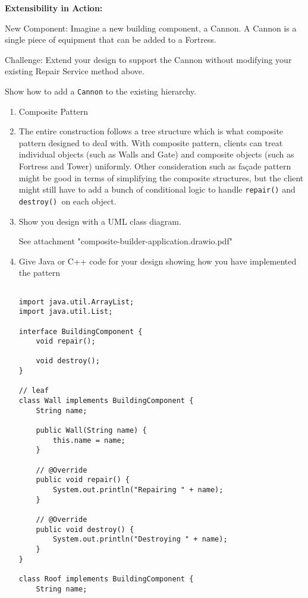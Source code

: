 {\bf Extensibility in Action:}

New Component: Imagine a new building component, a Cannon. A Cannon is a single piece of equipment that can be added to a Fortress. 

Challenge: Extend your design to support the Cannon without modifying your existing Repair Service method above.


Show how to add a  {\tt Cannon} to the existing hierarchy.


\begin{enumerate}

    \item Composite Pattern
    \item The entire construction follows a tree structure which is what composite pattern designed to deal with. With composite pattern, clients can treat individual objects (such as Walls and Gate) and composite objects (such as Fortress and Tower) uniformly. Other consideration such as façade pattern might be good in terms of simplifying the composite structures, but the client might still have to add a bunch of conditional logic to handle {\tt repair()} and {\tt destroy() }on each object. 
    \item Show you design with a UML class diagram.


    See attachment "composite-builder-application.drawio.pdf"

    \item Give Java or C++ code for your design showing how you have implemented the pattern

    \begin{verbatim} 
    
import java.util.ArrayList;
import java.util.List;

interface BuildingComponent {
    void repair();

    void destroy();
}

// leaf
class Wall implements BuildingComponent {
    String name;

    public Wall(String name) {
        this.name = name;
    }

    // @Override
    public void repair() {
        System.out.println("Repairing " + name);
    }

    // @Override
    public void destroy() {
        System.out.println("Destroying " + name);
    }
}

class Roof implements BuildingComponent {
    String name;


\end{verbatim}
\end{enumerate}
